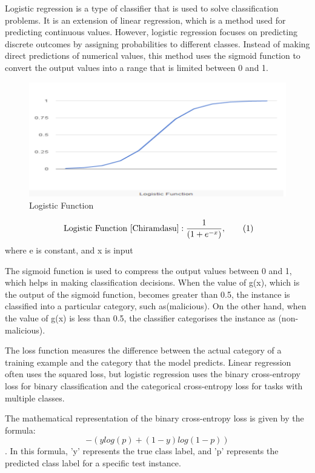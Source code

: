 Logistic regression is a type of classifier that is used to solve classification problems. It is an extension of linear regression, which is a method used for predicting continuous values. However, logistic regression focuses on predicting discrete outcomes by assigning probabilities to different classes. Instead of making direct predictions of numerical values, this method uses the sigmoid function to convert the output values into a range that is limited between 0 and 1.
\begin{figure}[htb]
\centerline{\includegraphics[width=1\textwidth]{Logisticfunction.png}}
\caption{Logistic Function \cite{Naresh_Gupta_Giri_2020}}
\label{logistic function }
\end{figure}

 \begin{equation*}{\text{ Logistic Function \cite{Chiramdasu}}}:  \frac{1}{{\left({1 + {e^{ - x}}}\right)}},\tag{1}\end{equation*} 
 \hfill \goodbreak
           where e is constant, and x is input

The sigmoid function is used to compress the output values between 0 and 1, which helps in making classification decisions. When the value of g(x), which is the output of the sigmoid function, becomes greater than 0.5, the instance is classified into a particular category, such as(malicious). On the other hand, when the value of g(x) is less than 0.5, the classifier categorises the instance as (non-malicious)\cite{Naresh_Gupta_Giri_2020}.

The loss function measures the difference between the actual category of a training example and the category that the model predicts. Linear regression often uses the squared loss, but logistic regression uses the binary cross-entropy loss for binary classification and the categorical cross-entropy loss for tasks with multiple classes.

The mathematical representation of the binary cross-entropy loss is given by the formula:
           $$-(ylog(p) + (1 - y)log(1 - p))$$
. In this formula, 'y' represents the true class label, and 'p' represents the predicted class label for a specific test instance.

